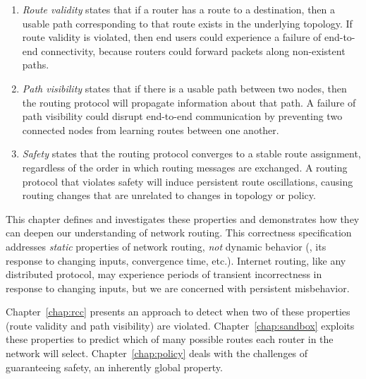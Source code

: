 \begin{enumerate}
\itemsep=-1pt
\item {\em Route validity} states that if a router has a route to a
destination, then a usable path corresponding to that route exists in
the underlying topology.  If route
validity is violated, then end users could experience a failure of
end-to-end connectivity, because routers could forward packets along
non-existent paths.
\item {\em Path visibility} states that if there is a usable path
between two nodes, then the routing protocol will propagate information
about that path.  A failure of path visibility could disrupt
end-to-end communication by preventing two connected nodes from learning
routes between one another.
\item {\em Safety} states that the routing protocol converges to a
stable route assignment, regardless of the order in which routing
messages are exchanged.  A routing protocol that violates safety will
induce persistent route oscillations, causing routing changes that
are unrelated to changes in topology or policy.
\end{enumerate}
\noindent
This chapter defines and investigates these properties and
demonstrates how they can 
deepen our understanding of network routing.
This correctness specification addresses {\em static} properties of
network routing, {\em not} dynamic behavior (\ie, its response to
changing inputs, convergence time, etc.). Internet routing, like any
distributed protocol, may experience periods of transient incorrectness
in response to changing inputs, but we are concerned with persistent
misbehavior.

Chapter~\ref{chap:rcc} presents an approach to detect when two
of these properties (route validity and path visibility) are violated.
Chapter~\ref{chap:sandbox} exploits
these properties to predict which
of many possible routes each router in the network will select.
Chapter~\ref{chap:policy} deals with the 
challenges of guaranteeing safety, an inherently global property.


